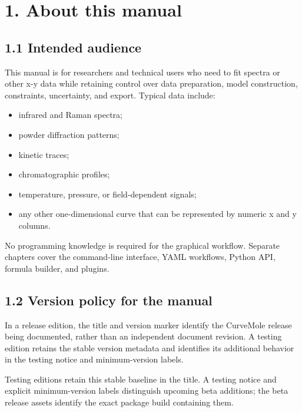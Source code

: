 \documentclass[
  10pt,
  a4paper,
  oneside]{scrreprt}
\providecommand{\tightlist}{%
  \setlength{\itemsep}{0pt}\setlength{\parskip}{0pt}}
\begin{document}
\hypertarget{about-this-manual}{%
\chapter{1. About this manual}\label{about-this-manual}}

\hypertarget{intended-audience}{%
\section{1.1 Intended audience}\label{intended-audience}}

This manual is for researchers and technical users who need to fit
spectra or other x-y data while retaining control over data preparation,
model construction, constraints, uncertainty, and export. Typical data
include:

\begin{itemize}
\tightlist
\item
  infrared and Raman spectra;
\item
  powder diffraction patterns;
\item
  kinetic traces;
\item
  chromatographic profiles;
\item
  temperature, pressure, or field-dependent signals;
\item
  any other one-dimensional curve that can be represented by numeric x
  and y columns.
\end{itemize}

No programming knowledge is required for the graphical workflow.
Separate chapters cover the command-line interface, YAML workflows,
Python API, formula builder, and plugins.

\hypertarget{version-policy-for-the-manual}{%
\section{1.2 Version policy for the
manual}\label{version-policy-for-the-manual}}

In a release edition, the title and version marker identify the
CurveMole release being documented, rather than an independent document
revision. A testing edition retains the stable version metadata and
identifies its additional behavior in the testing notice and
minimum-version labels.

Testing editions retain this stable baseline in the title. A testing
notice and explicit minimum-version labels distinguish upcoming beta
additions; the beta release assets identify the exact package build
containing them.
\end{document}
